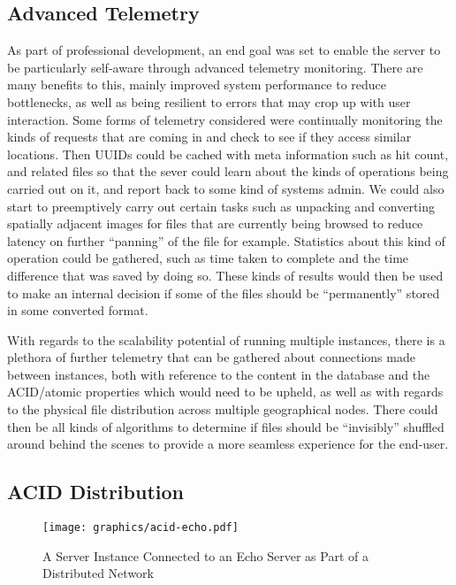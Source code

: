 \documentclass{article}
\begin{document}
\subsection{Advanced Telemetry}
As part of professional development, an end goal was set to enable the server to be particularly self-aware through advanced telemetry monitoring. There are many benefits to this, mainly improved system performance to reduce bottlenecks, as well as being resilient to errors that may crop up with user interaction.
Some forms of telemetry considered were continually monitoring the kinds of requests that are coming in and check to see if they access similar locations. Then UUIDs could be cached with meta information such as hit count, and related files so that the sever could learn about the kinds of operations being carried out on it, and report back to some kind of systems admin. We could also start to preemptively carry out certain tasks such as unpacking and converting spatially adjacent images for files that are currently being browsed to reduce latency on further “panning” of the file for example. Statistics about this kind of operation could be gathered, such as time taken to complete and the time difference that was saved by doing so. These kinds of results would then be used to make an internal decision if some of the files should be “permanently” stored in some converted format. 

With regards to the scalability potential of running multiple instances, there is a plethora of further telemetry that can be gathered about connections made between instances, both with reference to the content in the database and the ACID/atomic properties which would need to be upheld, as well as with regards to the physical file distribution across multiple geographical nodes.
There could then be all kinds of algorithms to determine if files should be “invisibly” shuffled around behind the scenes to provide a more seamless experience for the end-user.

\subsection{ACID Distribution}

\begin{figure}
    \centering
    \texttt{[image: graphics/acid-echo.pdf]}
    \caption{A Server Instance Connected to an Echo Server as Part of a Distributed Network}
    \label{fig:acid}
\end{figure}
\end{document}
